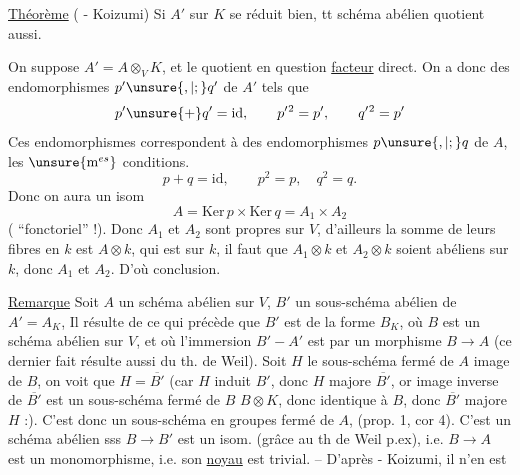 \uline{Théorème} ( - Koizumi) Si $A'$ sur $K$
se réduit bien, tt schéma abélien
quotient aussi.

On  suppose $A'=A\otimes_V K$,
et le quotient en question \uline{facteur} direct.
On a donc des endomorphismes
$p'\unsure{,|;}q'$ de $A'$ tels que
\[
p'\unsure{+}q'=\mathrm{id},\qquad p'{}^2=p',\qquad q'{}^2=p'
\]
Ces endomorphismes correspondent à
des endomorphismes $p\unsure{,|;}q$ de $A$, 
les $\unsure{\mathrm m^{es}}$ conditions.
\[
p+q=\mathrm{id},\qquad p^2=p,\quad q^2=q.
\]
Donc on aura un isom
\[
A=\mathrm{Ker}\,p\times\mathrm{Ker}\,q=A_1\times A_2
\]
( ``fonctoriel'' !). Donc $A_1$ et
$A_2$ sont propres sur $V$, d'ailleurs la
somme de leurs fibres en $k$ est $A\otimes k$,
qui est  sur $k$, il faut que $A_1\otimes k$ et $A_2\otimes k$
soient abéliens sur $k$, donc  $A_1$ et $A_2$. D'où 
conclusion.

\uline{Remarque} Soit $A$ un schéma abélien sur $V$,
$B'$ un sous-schéma abélien de $A'=A_K$,
Il résulte de ce qui précède que $B'$
est de la forme $B_K$, où $B$ est un
schéma abélien sur $V$, et où l'immersion
$B'\mathrel{-}A'$ est  par un morphisme
$B\longrightarrow A$ (ce dernier fait résulte
aussi du th. de Weil).  Soit
$H$ le sous-schéma fermé de $A$ image de $B$,
on voit  que $H=\overline{B'}$ (car $H$
induit $B'$,  donc $H$ majore $\overline{B'}$,
or  image inverse de $\overline{B'}$ est un
sous-schéma fermé de $B$  $B\otimes K$, donc
identique à $B$, donc $\overline{B'}$  majore $H$ :).
C'est donc un sous-schéma en groupes
fermé de $A$,  (prop. 1, cor 4). C'est
un schéma abélien sss $B\longrightarrow B'$ est
un isom. (grâce au th de Weil p.ex),
i.e. $B\longrightarrow A$ est un monomorphisme,
i.e. son \uline{noyau} est  trivial. --
D'après  - Koizumi, il n'en est

